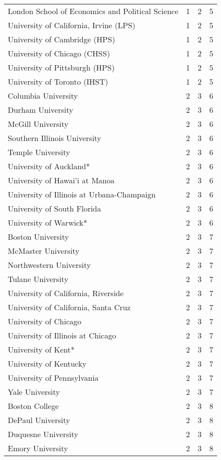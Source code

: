 \begin{longtable}[t]{llll}
London School of Economics and Political Science & 1 & 2 & 5\\
University of California, Irvine (LPS) & 1 & 2 & 5\\
University of Cambridge (HPS) & 1 & 2 & 5\\
University of Chicago (CHSS) & 1 & 2 & 5\\
\addlinespace
University of Pittsburgh (HPS) & 1 & 2 & 5\\
University of Toronto (IHST) & 1 & 2 & 5\\
Columbia University & 2 & 3 & 6\\
Durham University & 2 & 3 & 6\\
McGill University & 2 & 3 & 6\\
\addlinespace
Southern Illinois University & 2 & 3 & 6\\
Temple University & 2 & 3 & 6\\
University of Auckland* & 2 & 3 & 6\\
University of Hawai'i at Manoa & 2 & 3 & 6\\
University of Illinois at Urbana-Champaign & 2 & 3 & 6\\
\addlinespace
University of South Florida & 2 & 3 & 6\\
University of Warwick* & 2 & 3 & 6\\
Boston University & 2 & 3 & 7\\
McMaster University & 2 & 3 & 7\\
Northwestern University & 2 & 3 & 7\\
\addlinespace
Tulane University & 2 & 3 & 7\\
University of California, Riverside & 2 & 3 & 7\\
University of California, Santa Cruz & 2 & 3 & 7\\
University of Chicago & 2 & 3 & 7\\
University of Illinois at Chicago & 2 & 3 & 7\\
\addlinespace
University of Kent* & 2 & 3 & 7\\
University of Kentucky & 2 & 3 & 7\\
University of Pennsylvania & 2 & 3 & 7\\
Yale University & 2 & 3 & 7\\
Boston College & 2 & 3 & 8\\
\addlinespace
DePaul University & 2 & 3 & 8\\
Duquesne University & 2 & 3 & 8\\
Emory University & 2 & 3 & 8\\

\end{longtable}
